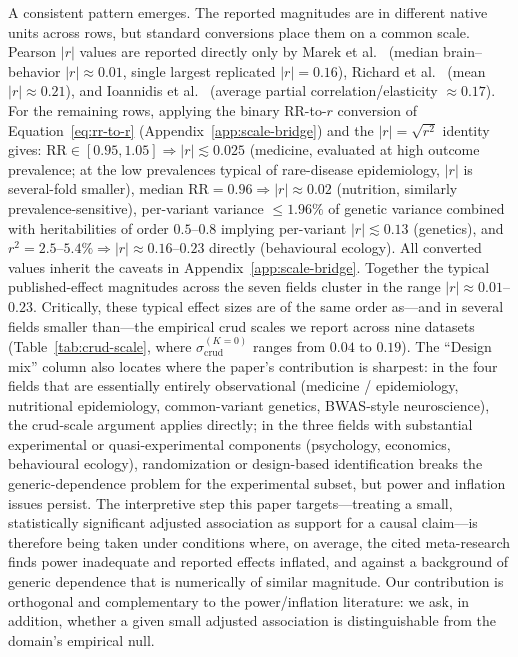 A consistent pattern emerges. The reported magnitudes are in different native units across rows, but standard conversions place them on a common scale. Pearson $|r|$ values are reported directly only by Marek et al.~\citep{marek2022} (median brain--behavior $|r|\approx 0.01$, single largest replicated $|r|=0.16$), Richard et al.~\citep{richard2003} (mean $|r|\approx 0.21$), and Ioannidis et al.~\citep{ioannidis2017econ} (average partial correlation/elasticity $\approx 0.17$). For the remaining rows, applying the binary RR-to-$r$ conversion of Equation~\eqref{eq:rr-to-r} (Appendix~\ref{app:scale-bridge}) and the $|r|=\sqrt{r^2}$ identity gives: $\mathrm{RR}\in[0.95,1.05]\Rightarrow |r|\lesssim 0.025$ (medicine, evaluated at high outcome prevalence; at the low prevalences typical of rare-disease epidemiology, $|r|$ is several-fold smaller), median $\mathrm{RR}=0.96\Rightarrow |r|\approx 0.02$ (nutrition, similarly prevalence-sensitive), per-variant variance $\le 1.96\%$ of genetic variance combined with heritabilities of order $0.5$--$0.8$ implying per-variant $|r|\lesssim 0.13$ (genetics), and $r^2=2.5$--$5.4\%\Rightarrow |r|\approx 0.16$--$0.23$ directly (behavioural ecology). All converted values inherit the caveats in Appendix~\ref{app:scale-bridge}. Together the typical published-effect magnitudes across the seven fields cluster in the range $|r|\approx 0.01$--$0.23$. Critically, these typical effect sizes are of the same order as---and in several fields smaller than---the empirical crud scales we report across nine datasets (Table~\ref{tab:crud-scale}, where $\sigma_{\mathrm{crud}}^{(K=0)}$ ranges from $0.04$ to $0.19$). The ``Design mix'' column also locates where the paper's contribution is sharpest: in the four fields that are essentially entirely observational (medicine / epidemiology, nutritional epidemiology, common-variant genetics, BWAS-style neuroscience), the crud-scale argument applies directly; in the three fields with substantial experimental or quasi-experimental components (psychology, economics, behavioural ecology), randomization or design-based identification breaks the generic-dependence problem for the experimental subset, but power and inflation issues persist. The interpretive step this paper targets---treating a small, statistically significant adjusted association as support for a causal claim---is therefore being taken under conditions where, on average, the cited meta-research finds power inadequate and reported effects inflated, and against a background of generic dependence that is numerically of similar magnitude. Our contribution is orthogonal and complementary to the power/inflation literature: we ask, in addition, whether a given small adjusted association is distinguishable from the domain's empirical null.


